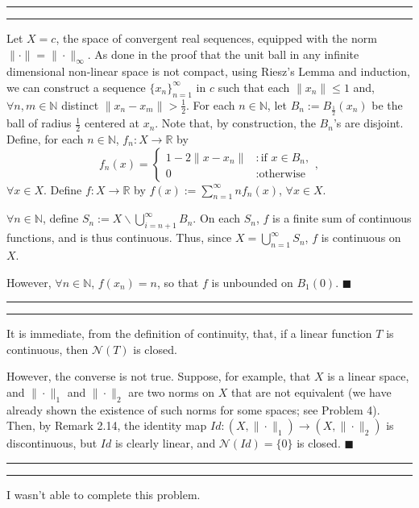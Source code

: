 \documentclass[11pt]{article}
\newcounter{questionCounter}
\newcounter{partCounter}[questionCounter]
\newenvironment{question}[2][\arabic{questionCounter}]{%
    \setcounter{partCounter}{0}%
    \vspace{.25in} \hrule \vspace{0.5em}%
        \noindent{\bf #2}%
    \vspace{0.8em} \hrule \vspace{.10in}%
    \addtocounter{questionCounter}{1}%
}{}
\renewcommand{\qed}{\quad $\blacksquare$}
\newcommand{\sminus}{\backslash}
\newcommand{\N}{\mathbb{N}} %
\newcommand{\R}{\mathbb{R}} %
\begin{document}
\begin{question}{Problem 11}
Let $X = c$, the space of convergent real sequences, equipped with the norm
$\|\cdot\| = \|\cdot\|_{\infty}$. As done in the proof that the unit ball in any infinite
dimensional non-linear space is not compact, using Riesz's Lemma and induction,
we can construct a sequence $\{x_n\}_{n = 1}^{\infty}$ in $c$ such that each
$\|x_n\| \leq 1$ and, $\forall n, m \in \N$ distinct $\|x_n - x_m\| > \frac12$.
For each $n \in \N$, let $B_n := B_{\frac12} (x_n)$ be the ball of radius
$\frac12$ centered at $x_n$. Note that, by construction, the $B_n$'s are
disjoint. Define, for each $n \in \N$, $f_n : X \rightarrow
\R$ by
\[
 f_n(x) = \left\{
    \begin{array}{cl}
    1 - 2\|x - x_n\| & : \mbox{if $x \in B_n$}, \\
    0 & : \mbox{otherwise}
    \end{array}
\right.,
\]
$\forall x \in X$. Define $f : X \rightarrow \R$ by $f(x) := \sum_{n =
1}^{\infty}nf_n(x)$, $\forall x \in X$.

$\forall n \in \N$, define $S_n := X \sminus \bigcup_{i = n + 1}^{\infty}
B_n$. On each $S_n$, $f$ is a finite sum of continuous functions, and is thus
continuous. Thus, since $X = \bigcup_{n = 1}^{\infty}S_n$, $f$ is
continuous on $X$.

However, $\forall n \in \N$, $f(x_n) = n$, so that $f$ is unbounded on
$B_1(0)$. \qed
\end{question}

\newpage
\begin{question}{Problem 13}
It is immediate, from the definition of continuity, that, if a linear function
$T$ is continuous, then $\mathcal{N}(T)$ is closed.

However, the converse is not true. Suppose, for example, that $X$ is a linear
space, and $\|\cdot\|_1$ and $\|\cdot\|_2$ are two norms on $X$ that are not
equivalent (we have already shown the existence of such norms for some spaces;
see Problem 4). Then, by Remark 2.14, the identity map $Id : (X,\|\cdot\|_1)
\rightarrow (X,\|\cdot\|_2)$ is discontinuous, but $Id$ is clearly linear, and
$\mathcal{N}(Id) = \{0\}$ is closed. \qed
\end{question}

\begin{question}{Problem 14}
I wasn't able to complete this problem.
\end{question}
\end{document}
